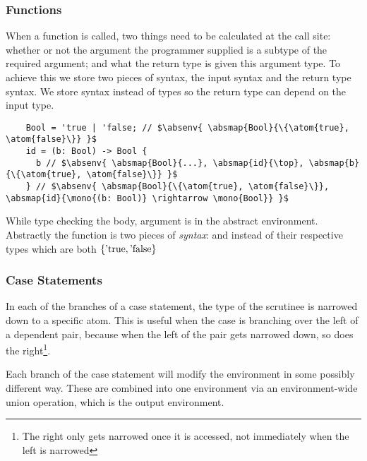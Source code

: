 \documentclass[12pt,twoside]{report}
\begin{document}
\subsubsection{Functions}
When a function is called, two things need to be calculated at the call site: whether or not the argument the programmer supplied is a subtype of the required argument; and what the return type is given this argument type. To achieve this we store two pieces of syntax, the input syntax and the return type syntax. We store syntax instead of types so the return type can depend on the input type.

\begin{listing}[H]
  \begin{verbatim}
    Bool = 'true | 'false; // $\absenv{ \absmap{Bool}{\{\atom{true}, \atom{false}\}} }$
    id = (b: Bool) -> Bool {
      b // $\absenv{ \absmap{Bool}{...}, \absmap{id}{\top}, \absmap{b}{\{\atom{true}, \atom{false}\}} }$
    } // $\absenv{ \absmap{Bool}{\{\atom{true}, \atom{false}\}}, \absmap{id}{\mono{(b: Bool)} \rightarrow \mono{Bool}} }$
  \end{verbatim}
  \caption{While type checking the body, argument  is in the abstract environment. Abstractly the function is two pieces of \textit{syntax}:  and  instead of their respective types which are both $\{\atom{true}, \atom{false}\}$}
\end{listing}



\subsubsection{Case Statements}
In each of the branches of a case statement, the type of the scrutinee is narrowed down to a specific atom. This is useful when the case is branching over the left of a dependent pair, because when the left of the pair gets narrowed down, so does the right\footnote{The right only gets narrowed once it is accessed, not immediately when the left is narrowed}.

Each branch of the case statement will modify the environment in some possibly different way. These are combined into one environment via an environment-wide union operation, which is the output environment.
\end{document}

